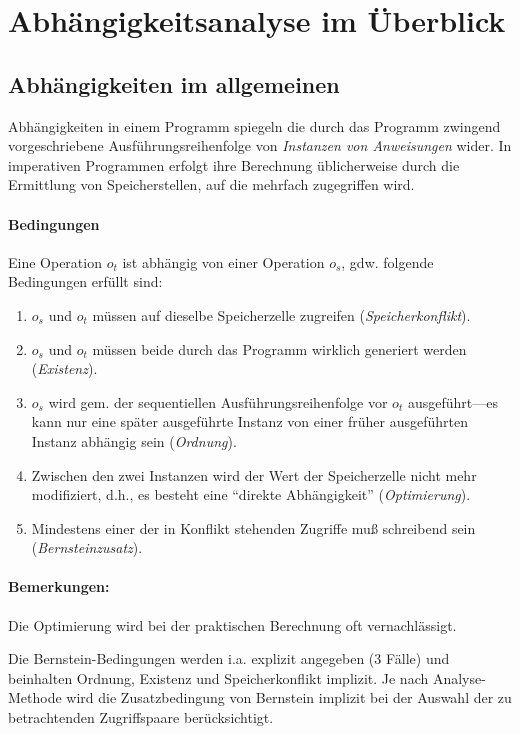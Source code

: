 \setcounter{section}{3}
\section{Abhängigkeitsanalyse im Überblick}


\subsection{Abhängigkeiten im allgemeinen}

Abhängigkeiten in einem Programm spiegeln die durch das Programm
zwingend vorgeschriebene Ausführungsreihenfolge von \emph{Instanzen von
Anweisungen} wider. In imperativen Programmen erfolgt ihre Berechnung
üblicherweise durch die Ermittlung von Speicherstellen, auf die mehrfach
zugegriffen wird. 


\paragraph{Bedingungen}

Eine Operation $o_t$ ist abhängig von einer Operation $o_s$, gdw.
folgende Bedingungen erfüllt sind:
\begin{enumerate}
\item $o_s$ und $o_t$ müssen auf dieselbe
  Speicherzelle zugreifen (\emph{Speicherkonflikt}).
\item $o_s$ und $o_t$ müssen beide durch
  das Programm wirklich generiert werden (\emph{Existenz}).
\item $o_s$ wird gem. der sequentiellen Ausführungsreihenfolge vor $o_t$ 
  ausgeführt---es kann nur eine später ausgeführte Instanz von einer früher
  ausgeführten Instanz abhängig sein (\emph{Ordnung}).
\item Zwischen den zwei Instanzen wird der Wert der Speicherzelle nicht
  mehr modifiziert, d.h., es besteht eine ``direkte Abhängigkeit''
  (\emph{Optimierung}).
\item Mindestens einer der in Konflikt stehenden Zugriffe muß schreibend
  sein (\emph{Bernsteinzusatz}).
\end{enumerate}

\paragraph{Bemerkungen:} Die Optimierung wird bei der praktischen
Berechnung oft vernachlässigt. 

Die Bernstein-Bedingungen werden i.a. explizit angegeben (3 Fälle) und
beinhalten Ordnung, Existenz und Speicherkonflikt implizit. Je nach
Analyse-Methode wird die Zusatzbedingung von Bernstein implizit bei der
Auswahl der zu betrachtenden Zugriffspaare berücksichtigt.


